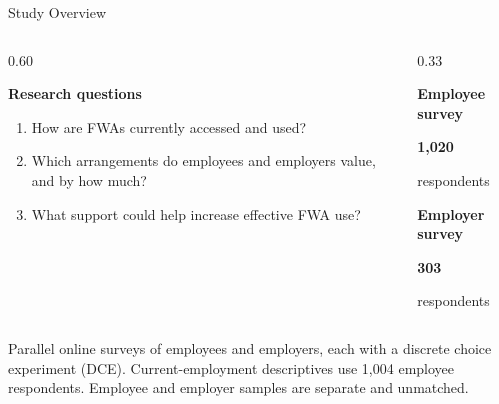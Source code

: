 \documentclass[aspectratio=169,11pt]{beamer}
\newcommand{\PanelTitle}[2]{%
  {\color{#1}\fontsize{12.5}{15}\selectfont
   \bfseries #2\par}
  \vspace{0.06cm}
}
\newcommand{\Subline}[1]{%
  {\color{Muted}\fontsize{10}{12.5}\selectfont
   \RaggedRight #1\par}
  \vspace{0.10cm}
}
\newcommand{\SlideNote}[1]{%
  \par\vspace{0.07cm}
  {\color{Muted}\fontsize{7.5}{9}\selectfont
   \RaggedRight #1\par}
}
\begin{document}
\begin{frame}[t]{Study Overview}

\vspace{0.10cm}

\begin{columns}[T,onlytextwidth]

\begin{column}{0.60\textwidth}

\PanelTitle{Navy}{Research questions}

\begin{enumerate}
  \setlength{\itemsep}{0.32cm}
  \item How are FWAs currently accessed and used?
  \item Which arrangements do employees and employers value,
        and by how much?
  \item What support could help increase effective FWA use?
\end{enumerate}

\end{column}

\begin{column}{0.33\textwidth}

\PanelTitle{Employee}{Employee survey}

{\color{Employee}\fontsize{30}{34}\selectfont
\bfseries 1,020\par}

\Subline{respondents}

\vspace{0.30cm}

\PanelTitle{Employer}{Employer survey}

{\color{Employer}\fontsize{30}{34}\selectfont
\bfseries 303\par}

\Subline{respondents}

\end{column}

\end{columns}

\vfill

\SlideNote{
Parallel online surveys of employees and employers, each with a
discrete choice experiment (DCE).
Current-employment descriptives use 1,004 employee respondents.
Employee and employer samples are separate and unmatched.
}

\end{frame}

\end{document}
